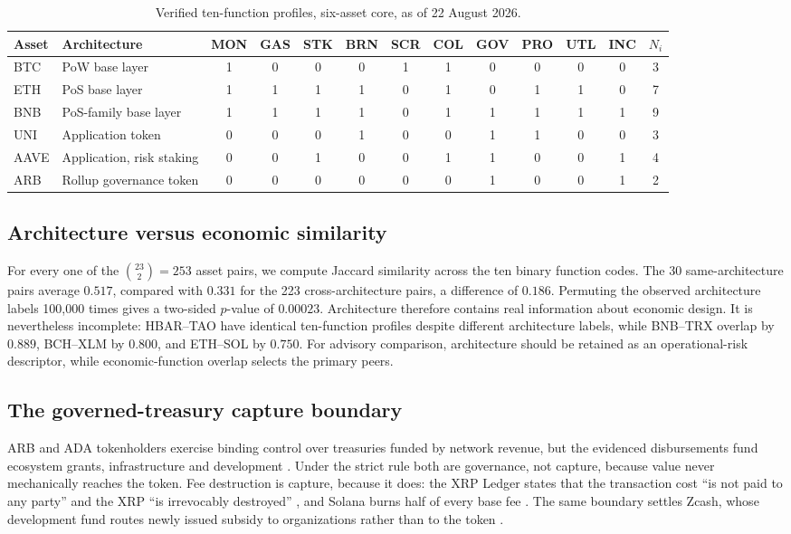 \documentclass[10pt]{article}
\begin{document}
\begin{table}[ht]
\centering
\small
\begin{tabular}{llcccccccccc c}
\toprule
Asset & Architecture & MON & GAS & STK & BRN & SCR & COL & GOV & PRO & UTL & INC & $N_i$ \\
\midrule
BTC  & PoW base layer            & 1 & 0 & 0 & 0 & 1 & 1 & 0 & 0 & 0 & 0 & 3 \\
ETH  & PoS base layer            & 1 & 1 & 1 & 1 & 0 & 1 & 0 & 1 & 1 & 0 & 7 \\
BNB  & PoS-family base layer     & 1 & 1 & 1 & 1 & 0 & 1 & 1 & 1 & 1 & 1 & 9 \\
UNI  & Application token         & 0 & 0 & 0 & 1 & 0 & 0 & 1 & 1 & 0 & 0 & 3 \\
AAVE & Application, risk staking & 0 & 0 & 1 & 0 & 0 & 1 & 1 & 0 & 0 & 1 & 4 \\
ARB  & Rollup governance token   & 0 & 0 & 0 & 0 & 0 & 0 & 1 & 0 & 0 & 1 & 2 \\
\bottomrule
\end{tabular}
\caption{Verified ten-function profiles, six-asset core, as of 22 August 2026.}
\label{tab:core}
\end{table}

\subsection{Architecture versus economic similarity}
For every one of the ${23 \choose 2}=253$ asset pairs, we compute Jaccard similarity across the ten binary function codes. The 30 same-architecture pairs average $0.517$, compared with $0.331$ for the 223 cross-architecture pairs, a difference of $0.186$. Permuting the observed architecture labels 100,000 times gives a two-sided $p$-value of $0.00023$. Architecture therefore contains real information about economic design. It is nevertheless incomplete: HBAR--TAO have identical ten-function profiles despite different architecture labels, while BNB--TRX overlap by $0.889$, BCH--XLM by $0.800$, and ETH--SOL by $0.750$. For advisory comparison, architecture should be retained as an operational-risk descriptor, while economic-function overlap selects the primary peers.

\subsection{The governed-treasury capture boundary}
ARB and ADA tokenholders exercise binding control over treasuries funded by network revenue, but the evidenced disbursements fund ecosystem grants, infrastructure and development \citep{cardano2026cip1694,arbitrum2026transparency}. Under the strict rule both are governance, not capture, because value never mechanically reaches the token. Fee destruction is capture, because it does: the XRP Ledger states that the transaction cost ``is not paid to any party'' and the XRP ``is irrevocably destroyed'' \citep{xrpl2026cost}, and Solana burns half of every base fee \citep{solana2026fees}. The same boundary settles Zcash, whose development fund routes newly issued subsidy to organizations rather than to the token \citep{zcash2026zip1014}.
\end{document}
